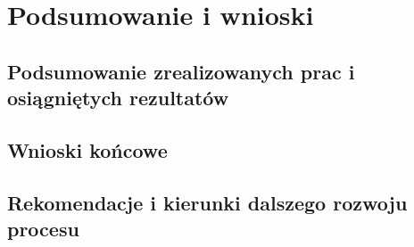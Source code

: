 \chapter{Podsumowanie i wnioski}\label{ch:podsumowanie}

\section{Podsumowanie zrealizowanych prac i osiągniętych rezultatów}\label{sec:podsumowanie-prac}

\section{Wnioski końcowe}\label{sec:wnioski}

\section{Rekomendacje i kierunki dalszego rozwoju procesu}\label{sec:dalsze-prace}
